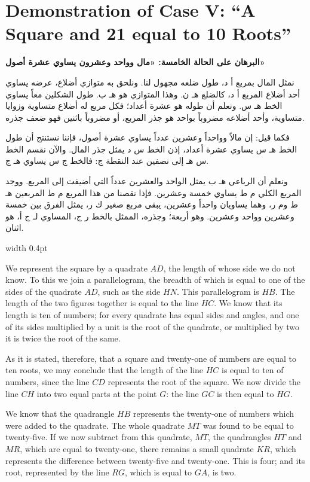 \documentclass[11pt,a4paper]{book}
\begin{document}
\newpage

\section*{Demonstration of Case V: ``A Square and 21 equal to 10 Roots''}

\noindent\begin{minipage}[t]{0.48\textwidth}
\raggedleft

\begin{Arabic}
\textbf{البرهان على الحالة الخامسة: «مال وواحد وعشرون يساوي عشرة أصول»}

نمثل المال بمربع أ د، طول ضلعه مجهول لنا. ونلحق به متوازي أضلاع، عرضه يساوي أحد أضلاع المربع أ د، كالضلع هـ ن. وهذا المتوازي هو هـ ب. طول الشكلين معاً يساوي الخط هـ س. ونعلم أن طوله هو عشرة أعداد؛ فكل مربع له أضلاع متساوية وزوايا متساوية، وأحد أضلاعه مضروباً بواحد هو جذر المربع، أو مضروباً باثنين فهو ضعف جذره.

فكما قيل: إن مالاً وواحداً وعشرين عدداً يساوي عشرة أصول، فإننا نستنتج أن طول الخط هـ س يساوي عشرة أعداد، إذن الخط س د يمثل جذر المال. والآن نقسم الخط س هـ إلى نصفين عند النقطة ج: فالخط ج س يساوي هـ ج.

ونعلم أن الرباعي هـ ب يمثل الواحد والعشرين عدداً التي أضيفت إلى المربع. ووجد المربع الكلي م ط يساوي خمسة وعشرين. فإذا نقصنا من هذا المربع م ط المربعين هـ ط وم ر، وهما يساويان واحداً وعشرين، يبقى مربع صغير ك ر، يمثل الفرق بين خمسة وعشرين وواحد وعشرين. وهو أربعة؛ وجذره، الممثل بالخط ر ج، المساوي لـ ج أ، هو اثنان.
\end{Arabic}

\end{minipage}%
\hfill\vrule width 0.4pt\hfill
\begin{minipage}[t]{0.48\textwidth}
\raggedright

We represent the square by a quadrate $AD$, the length of whose side we do not know. To this we join a parallelogram, the breadth of which is equal to one of the sides of the quadrate $AD$, such as the side $HN$. This parallelogram is $HB$. The length of the two figures together is equal to the line $HC$. We know that its length is ten of numbers; for every quadrate has equal sides and angles, and one of its sides multiplied by a unit is the root of the quadrate, or multiplied by two it is twice the root of the same.

As it is stated, therefore, that a square and twenty-one of numbers are equal to ten roots, we may conclude that the length of the line $HC$ is equal to ten of numbers, since the line $CD$ represents the root of the square. We now divide the line $CH$ into two equal parts at the point $G$: the line $GC$ is then equal to $HG$.

We know that the quadrangle $HB$ represents the twenty-one of numbers which were added to the quadrate. The whole quadrate $MT$ was found to be equal to twenty-five. If we now subtract from this quadrate, $MT$, the quadrangles $HT$ and $MR$, which are equal to twenty-one, there remains a small quadrate $KR$, which represents the difference between twenty-five and twenty-one. This is four; and its root, represented by the line $RG$, which is equal to $GA$, is two.

\end{minipage}
\end{document}
